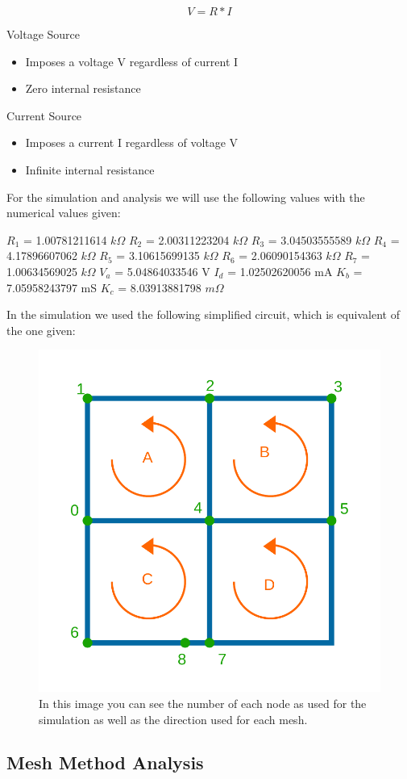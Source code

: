 \begin{equation}
	V = R * I
	\label{eq:kvl}
\end{equation}

Voltage Source

\begin{itemize}
	\item Imposes a voltage V regardless of current I
	\item Zero internal resistance
\end{itemize}

Current Source

\begin{itemize}
	\item Imposes a current I regardless of voltage V
	\item Infinite internal resistance
\end{itemize}

For the simulation and analysis we will use the following values with the numerical values given:

$R_1$ = 1.00781211614 $k\Omega$
$R_2$ = 2.00311223204 $k\Omega$
$R_3$ = 3.04503555589 $k\Omega$
$R_4$ = 4.17896607062 $k\Omega$
$R_5$ = 3.10615699135 $k\Omega$
$R_6$ = 2.06090154363 $k\Omega$
$R_7$ = 1.00634569025 $k\Omega$
$V_a$ = 5.04864033546 V
$I_d$ = 1.02502620056 mA
$K_b$ = 7.05958243797 mS
$K_c$ = 8.03913881798 $m\Omega$

In the simulation we used the following simplified circuit, which is equivalent of the one given:

\begin{figure}[h] \centering
	\includegraphics[width=0.4\linewidth]{sim.pdf}
	\caption{In this image you can see the number of each node as used for the simulation as well as the direction used for each mesh.}
	\label{fig:sim}
\end{figure}

\subsection{Mesh Method Analysis}

